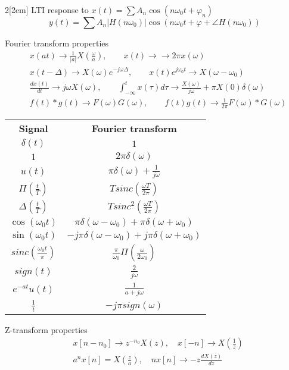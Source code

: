 \documentclass[leqno]{article}
\begin{document}
\begin{multicols}{2}[\columnsep2em]
LTI response to $x(t)=\sum A_n \cos(n\omega _0t + \varphi _n)$
\[
y(t) = \sum A_n|H(n\omega _0)|\cos(n\omega_0t+ \varphi + \angle H(n\omega _0))
\] 

Fourier transform properties
\begin{align*}
&x(at)\to  \frac{1}{|a|}X(\frac{\omega}{a}), \qquad x(t) \to  \to  2\pi x(\omega) \\
&x(t-\Delta) \to X(\omega )e^{-j\omega \Delta}, \qquad x(t)e^{j\omega_0 t} \to X(\omega -\omega _0)\\
&\frac{d x(t)}{d t} \to j\omega X(\omega), \qquad \int_{-\infty}^tx(\tau)d\tau \to \frac{X(\omega )}{j\omega  }+ \pi X(0)\delta(\omega ) \\
&f(t)\ast g(t) \to F(\omega )G(\omega ), \qquad f(t)g(t) \to \frac{1}{2\pi}F(\omega )\ast G(\omega )
\end{align*}

\begin{center}
\begin{tabular}{cc}
  \textbf{Signal} & \textbf{Fourier transform}\\
  $\delta(t)$ & $1$ \\
  $1$ & $2\pi \delta(\omega)$\\
  $u(t)$ &  $\pi \delta(\omega ) + \frac{1}{j\omega }$ \\
  $\Pi (\frac{t}{T})$ & $Tsinc(\frac{\omega T}{2\pi})$ \\
  $\Delta  (\frac{t}{T})$ & $Tsinc^2(\frac{\omega T}{2\pi})$ \\
  $\cos(\omega _0t)$ & $\pi\delta(\omega -\omega _0)+ \pi\delta(\omega +\omega _0)$\\
  $\sin(\omega _0t)$ & $-j\pi\delta(\omega -\omega _0)+ j\pi\delta(\omega +\omega _0)$\\
  $sinc(\frac{\omega _0 t}{\pi})$ & $\frac{\pi}{\omega _0}\Pi(\frac{\omega }{2\omega _0})$\\
  $sign(t)$ &   $\frac{2}{j\omega }$\\
  $e^{-at}u(t)$ & $\frac{1}{a+j\omega }$ \\
  $\frac{1}{t}$ & $-j\pi sign(\omega)$
\end{tabular}
\end{center}

Z-transform properties
\begin{align*}
  &x[n-n_0] \to z^{-n_0}X(z), \quad x[-n] \to X(\frac{1}{z})\\
  &a^nx[n] = X(\frac{z}{a}), \quad nx[n] \to -z\frac{d X(z)}{d z} 
\end{align*}


\end{multicols}
\end{document}
